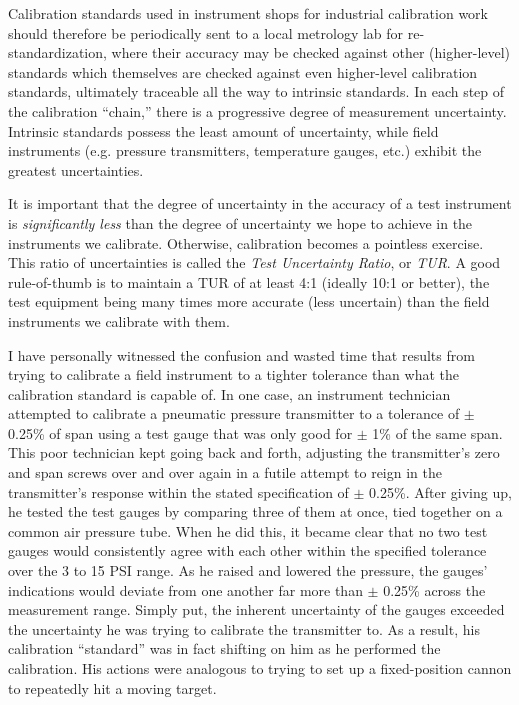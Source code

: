 Calibration standards used in instrument shops for industrial calibration work should therefore be periodically sent to a local metrology lab for re-standardization, where their accuracy may be checked against other (higher-level) standards which themselves are checked against even higher-level calibration standards, ultimately traceable all the way to intrinsic standards.  In each step of the calibration ``chain,'' there is a progressive degree of measurement uncertainty.  Intrinsic standards possess the least amount of uncertainty, while field instruments (e.g. pressure transmitters, temperature gauges, etc.) exhibit the greatest uncertainties.

\vskip 10pt

It is important that the degree of uncertainty in the accuracy of a test instrument is \textit{significantly less} than the degree of uncertainty we hope to achieve in the instruments we calibrate.  Otherwise, calibration becomes a pointless exercise.  This ratio of uncertainties is called the \textit{Test Uncertainty Ratio}, or \textit{TUR}.  A good rule-of-thumb is to maintain a TUR of at least 4:1 (ideally 10:1 or better), the test equipment being many times more accurate (less uncertain) than the field instruments we calibrate with them.    

I have personally witnessed the confusion and wasted time that results from trying to calibrate a field instrument to a tighter tolerance than what the calibration standard is capable of.  In one case, an instrument technician attempted to calibrate a pneumatic pressure transmitter to a tolerance of $\pm$ 0.25\% of span using a test gauge that was only good for $\pm$ 1\% of the same span.  This poor technician kept going back and forth, adjusting the transmitter's zero and span screws over and over again in a futile attempt to reign in the transmitter's response within the stated specification of $\pm$ 0.25\%.  After giving up, he tested the test gauges by comparing three of them at once, tied together on a common air pressure tube.  When he did this, it became clear that no two test gauges would consistently agree with each other within the specified tolerance over the 3 to 15 PSI range.  As he raised and lowered the pressure, the gauges' indications would deviate from one another far more than $\pm$ 0.25\% across the measurement range.  Simply put, the inherent uncertainty of the gauges exceeded the uncertainty he was trying to calibrate the transmitter to.  As a result, his calibration ``standard'' was in fact shifting on him as he performed the calibration.  His actions were analogous to trying to set up a fixed-position cannon to repeatedly hit a moving target.

